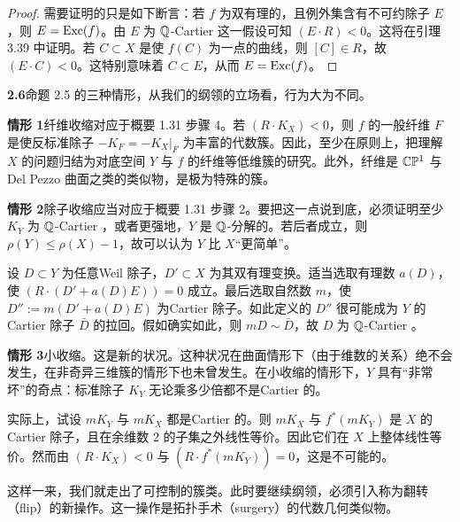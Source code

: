 
\begin{proof}
需要证明的只是如下断言：若 $f$ 为双有理的，且例外集含有不可约除子 $E$，则 $E=\operatorname{Exc}(f)$。由 $E$ 为 $\mathbb{Q}$-Cartier 这一假设可知 $(E\cdot R)<0$。这将在引理 3.39 中证明。若 $C\subset X$ 是使 $f(C)$ 为一点的曲线，则 $[C]\in R$，故 $(E\cdot C)<0$。这特别意味着 $C\subset E$，从而 $E=\operatorname{Exc}(f)$。
\end{proof}

\par\medskip\noindent\textbf{2.6}\quad 命题 2.5 的三种情形，从我们的纲领的立场看，行为大为不同。

\par\medskip\noindent\textbf{情形 1}\quad 纤维收缩对应于概要 1.31 步骤 4。若 $(R\cdot K_X)<0$，则 $f$ 的一般纤维 $F$ 是使反标准除子 $-K_F=-K_X|_F$ 为丰富的代数簇。因此，至少在原则上，把理解 $X$ 的问题归结为对底空间 $Y$ 与 $f$ 的纤维等低维簇的研究。此外，纤维是 $\mathbb{C}\mathbb{P}^1$ 与 Del Pezzo 曲面之类的类似物，是极为特殊的簇。

\par\medskip\noindent\textbf{情形 2}\quad 除子收缩应当对应于概要 1.31 步骤 2。要把这一点说到底，必须证明至少 $K_Y$ 为 $\mathbb{Q}$-Cartier ，或者更强地，$Y$ 是 $\mathbb{Q}$-分解的。若后者成立，则 $\rho(Y)\le\rho(X)-1$，故可以认为 $Y$ 比 $X$“更简单”。

设 $D\subset Y$ 为任意Weil 除子，$D'\subset X$ 为其双有理变换。适当选取有理数 $a(D)$，使 $(R\cdot(D'+a(D)E))=0$ 成立。最后选取自然数 $m$，使 $D'':=m(D'+a(D)E)$ 为Cartier 除子。如此定义的 $D''$ 很可能成为 $Y$ 的Cartier 除子 $\bar D$ 的拉回。假如确实如此，则 $mD\sim\bar D$，故 $D$ 为 $\mathbb{Q}$-Cartier 。

\par\medskip\noindent\textbf{情形 3}\quad 小收缩。这是新的状况。这种状况在曲面情形下（由于维数的关系）绝不会发生，在非奇异三维簇的情形下也未曾发生。在小收缩的情形下，$Y$ 具有“非常坏”的奇点：标准除子 $K_Y$ 无论乘多少倍都不是Cartier 的。

实际上，试设 $mK_Y$ 与 $mK_X$ 都是Cartier 的。则 $mK_X$ 与 $f^*(mK_Y)$ 是 $X$ 的Cartier 除子，且在余维数 2 的子集之外线性等价。因此它们在 $X$ 上整体线性等价。然而由 $(R\cdot K_X)<0$ 与 $(R\cdot f^*(mK_Y))=0$，这是不可能的。

这样一来，我们就走出了可控制的簇类。此时要继续纲领，必须引入称为翻转（flip）的新操作。这一操作是拓扑手术（surgery）的代数几何类似物。

